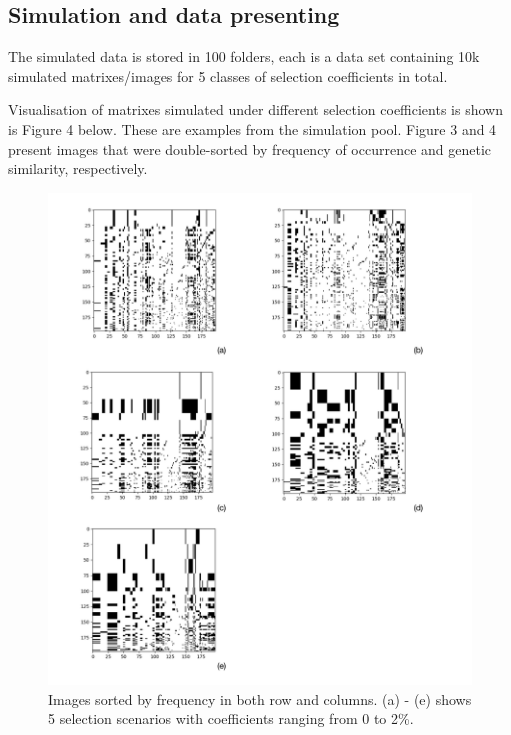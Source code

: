 \documentclass[a4paper,12pt,oneside]{extarticle}
\begin{document}
\subsection{Simulation and data presenting}
The simulated data is stored in 100 folders, each is a data set containing 10k simulated matrixes/images for 5 classes of selection coefficients in total. 
\par
Visualisation of matrixes simulated under different selection coefficients is shown is Figure 4 below. These are examples from the simulation pool. Figure 3 and 4 present images that were double-sorted by frequency of occurrence and genetic similarity, respectively. 
\begin{figure}[H] 
  \captionsetup{singlelinecheck = false, justification=justified}
  \centering
  \includegraphics[trim = 0 5mm 0 5mm, clip,width=1\textwidth]{figure3.png}
  \caption{Images sorted by frequency in both row and columns. (a) - (e) shows 5 selection scenarios with coefficients ranging from 0 to 2\%.}
\end{figure}
\end{document}
